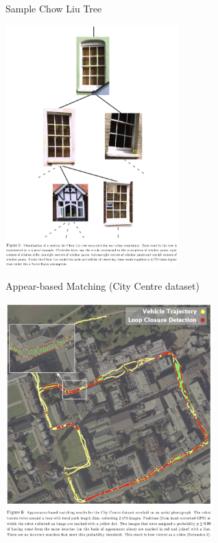\documentclass[dvipsnames, handout]{beamer}
\newcommand{\1}{\mathds{1}}	%
\begin{document}
\begin{frame}[t]{Sample Chow Liu Tree}
\begin{center}
\includegraphics[width=0.5\textwidth]{imgs/fig5.png}
\end{center}
\end{frame}


\begin{frame}[t]{Appear-based Matching (City Centre dataset)}
\begin{center}
\includegraphics[width=0.6\textwidth]{imgs/fig6.png}
\end{center}
\end{frame}
\end{document}
